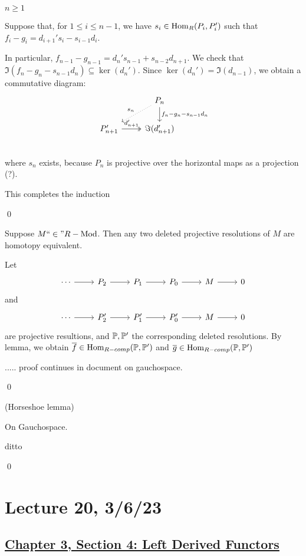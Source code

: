 \documentclass[x11names,reqno,14pt]{extarticle}
\newcommand{\fin}{``\in"}
\newcommand{\RMod}{R-\text{Mod}}
\newcommand{\barf}{\bar{f}}
\begin{document}
\underline{$n \geq 1$}

Suppose that, for $1 \leq i \leq n - 1$, we have $s_i \in {\mathrm{Hom}}_R(P_i, P_i')$ such that $f_i - g_i = d_{i + 1}'s_i - s_{i - 1}d_i$. 

In particular, $f_{n - 1} - g_{n - 1} = d_n's_{n - 1} + s_{n - 2}d_{n + 1}$. We check that $\Im(f_n - g_n - s_{n - 1}d_n)\subseteq \ker(d_n')$. Since $\ker(d_n') = \Im(d_{n - 1})$, we obtain a commutative diagram:
\[
\begin{tikzcd}
&P_n\ar[dl, dotted, "s_n"']\ar[d, "f_n - g_n - s_{n - 1}d_n"] \\
P_{n + 1}' \ar[r, twoheadrightarrow, "d_{n + 1}'"] & \Im(d_{n + 1}') \\
\end{tikzcd}
\]
where $s_n$ exists, because $P_n$ is projective over the horizontal maps as a projection (?). 

This completes the induction

\qed

\cor

Suppose $M \fin \RMod$. Then any two deleted projective resolutions of $M$ are homotopy equivalent. 

\proof

Let 
\[
\begin{tikzcd} \cdots \ar[r] & P_2 \ar[r] & P_1 \ar[r] &P_0 \ar[r] & M \ar[r] & 0 \end{tikzcd}
\]
and 
\[
\begin{tikzcd} \cdots \ar[r] & P_2' \ar[r] & P_1' \ar[r] &P_0' \ar[r] & M \ar[r] & 0 \end{tikzcd}
\]
are projective resultions, and $\mathbb{P},\mathbb{P}'$ the corresponding deleted resolutions. By lemma, we obtain $\barf\in\Hom_{R-comp}(\mbb{P},\mbb{P}')$ and $\overline{g} \in {\mathrm{Hom}}_{R-comp}(\mathbb{P},\mathbb{P}')$

..... proof continues in document on gauchospace.

\qed

\lem (Horseshoe lemma) 

On Gauchospace.

\proof

ditto

\qed

\section*{Lecture 20, 3/6/23}

\subsection*{\underline{Chapter 3, Section 4: Left Derived Functors}}
\end{document}

